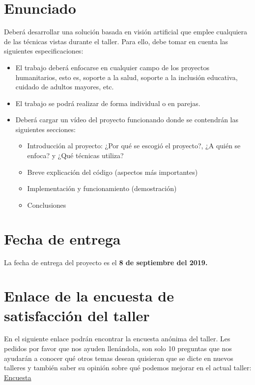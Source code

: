 \documentclass[a4paper,10pt]{article}
\begin{document}
\section{Enunciado}

Deberá desarrollar una solución basada en visión artificial que emplee cualquiera de las técnicas vistas durante el taller. Para ello, debe tomar en cuenta las siguientes especificaciones:

\begin{itemize}
	\item El trabajo deberá enfocarse en cualquier campo de los proyectos humanitarios, esto es, soporte a la salud, soporte a la inclusión educativa, cuidado de adultos mayores, etc.
	\item El trabajo se podrá realizar de forma individual o en parejas.
	\item Deberá cargar un vídeo del proyecto funcionando donde se contendrán las siguientes secciones:
	\begin{itemize}
		\item Introducción al proyecto: ¿Por qué se escogió el proyecto?, ¿A quién se enfoca? y ¿Qué técnicas utiliza?
		\item Breve explicación del código (aspectos más importantes)
		\item Implementación y funcionamiento (demostración)
		\item Conclusiones
	\end{itemize}
\end{itemize}


\section{Fecha de entrega}

La fecha de entrega del proyecto es el \textbf{8 de septiembre del 2019.}


\section{Enlace de la encuesta de satisfacción del taller}

En el siguiente enlace podrán encontrar la encuesta anónima del taller. Les pedidos por favor que nos ayuden llenándola, son solo 10 preguntas que nos ayudarán a conocer qué otros temas desean quisieran que se dicte en nuevos talleres y también saber su opinión sobre qué podemos mejorar en el actual taller: \\
\hspace*{0.43cm} \href{https://forms.gle/Ef9baxM63aNpTDDU9}{Encuesta}\\
\end{document}
